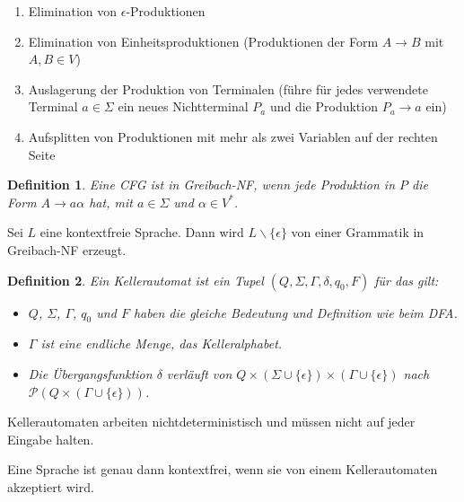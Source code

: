 \documentclass{cheat-sheet}
\newtheorem*{definition}{Definition}
\begin{document}
\begin{enumerate}
  \item Elimination von $\epsilon$-Produktionen
  \item Elimination von Einheitsproduktionen (Produktionen der Form $A \longrightarrow B$ mit $A, B \in V$)
  \item Auslagerung der Produktion von Terminalen (führe für jedes verwendete Terminal $a \in \Sigma$ ein neues Nichtterminal $P_{a}$ und die Produktion $P_{a} \longrightarrow a$ ein)
  \item Aufsplitten von Produktionen mit mehr als zwei Variablen auf der rechten Seite
\end{enumerate}


\begin{definition}
Eine CFG ist in \emph{Greibach-NF}, wenn jede Produktion in $P$ die Form $A \longrightarrow a \alpha$ hat, mit $a \in \Sigma$ und $\alpha \in V^{*}$.
\end{definition}

\begin{satz}
Sei $L$ eine kontextfreie Sprache. Dann wird $L \backslash \{ \epsilon \}$ von einer Grammatik in Greibach-NF erzeugt.
\end{satz}

\begin{definition}
Ein \emph{Kellerautomat} ist ein Tupel $(Q, \Sigma, \Gamma, \delta, q_{0}, F)$ für das gilt:

\begin{itemize}
  \item $Q$, $\Sigma$, $\Gamma$, $q_{0}$ und $F$ haben die gleiche Bedeutung und Definition wie beim DFA.
  \item $\Gamma$ ist eine endliche Menge, das \emph{Kelleralphabet}.
  \item Die Übergangsfunktion $\delta$ verläuft von $Q \times (\Sigma \cup \{ \epsilon \}) \times (\Gamma \cup \{ \epsilon \})$ nach $\mathcal{P}(Q \times (\Gamma \cup \{ \epsilon \}))$.
\end{itemize}
\end{definition}

\begin{bem}
Kellerautomaten arbeiten nichtdeterministisch und müssen nicht auf jeder Eingabe halten.
\end{bem}


\begin{satz}
Eine Sprache ist genau dann kontextfrei, wenn sie von einem Kellerautomaten akzeptiert wird.
\end{satz}
\end{document}
